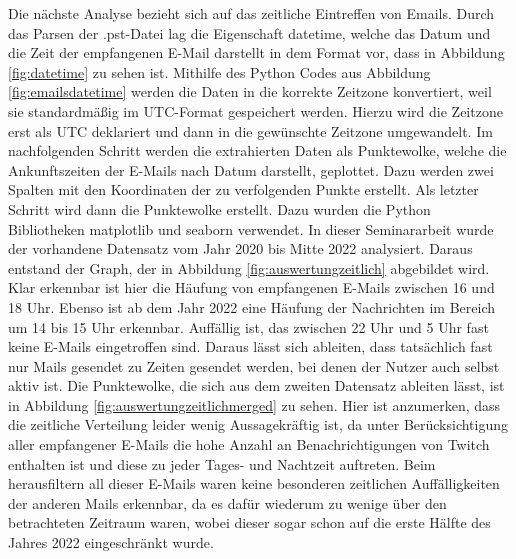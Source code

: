Die nächste Analyse bezieht sich auf das zeitliche Eintreffen von Emails. Durch das Parsen der .pst-Datei lag die Eigenschaft \glqq{}datetime\grqq, welche das Datum und die Zeit der empfangenen E-Mail darstellt in dem Format vor, dass in Abbildung \ref{fig:datetime} zu sehen ist. Mithilfe des Python Codes aus Abbildung \ref{fig:emailsdatetime} werden die Daten in die korrekte Zeitzone konvertiert, weil sie standardmäßig im UTC-Format gespeichert werden. Hierzu wird die Zeitzone erst als UTC deklariert und dann in die gewünschte Zeitzone umgewandelt. Im nachfolgenden Schritt werden die extrahierten Daten als Punktewolke, welche die Ankunftszeiten der E-Mails nach Datum darstellt, geplottet. Dazu werden zwei Spalten mit den Koordinaten der zu verfolgenden Punkte erstellt. Als letzter Schritt wird dann die Punktewolke erstellt. Dazu wurden die Python Bibliotheken \glqq{}matplotlib\grqq{} und \glqq{}seaborn\grqq{} verwendet. In dieser Seminararbeit wurde der vorhandene Datensatz vom Jahr 2020 bis Mitte 2022 analysiert. \newline
Daraus entstand der Graph, der in Abbildung \ref{fig:auswertungzeitlich} abgebildet wird. Klar erkennbar ist hier die Häufung von empfangenen E-Mails zwischen 16 und 18 Uhr. Ebenso ist ab dem Jahr 2022 eine Häufung der Nachrichten im Bereich um 14 bis 15 Uhr erkennbar. Auffällig ist, das zwischen 22 Uhr und 5 Uhr fast keine E-Mails eingetroffen sind. Daraus lässt sich ableiten, dass tatsächlich fast nur Mails gesendet zu Zeiten gesendet werden, bei denen der Nutzer auch selbst aktiv ist. \newline
Die Punktewolke, die sich aus dem zweiten Datensatz ableiten lässt, ist in Abbildung \ref{fig:auswertungzeitlichmerged} zu sehen. Hier ist anzumerken, dass die zeitliche Verteilung leider wenig Aussagekräftig ist, da unter Berücksichtigung aller empfangener E-Mails die hohe Anzahl an Benachrichtigungen von \glqq{}Twitch\grqq{} enthalten ist und diese zu jeder Tages- und Nachtzeit auftreten. Beim herausfiltern all dieser E-Mails waren keine besonderen zeitlichen Auffälligkeiten der anderen Mails erkennbar, da es dafür wiederum zu wenige über den betrachteten Zeitraum waren, wobei dieser sogar schon auf die erste Hälfte des Jahres 2022 eingeschränkt wurde. 

